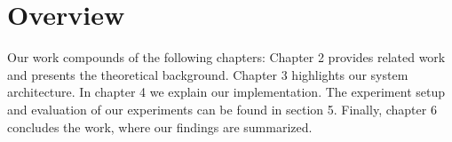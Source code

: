 
\section{Overview}

Our work compounds of the following chapters:
Chapter 2 provides related work and presents the theoretical background. Chapter 3 highlights our system architecture. In chapter 4 we explain our implementation. The experiment setup and evaluation of our experiments can be found in section 5. Finally, chapter 6 concludes the work, where our findings are summarized.